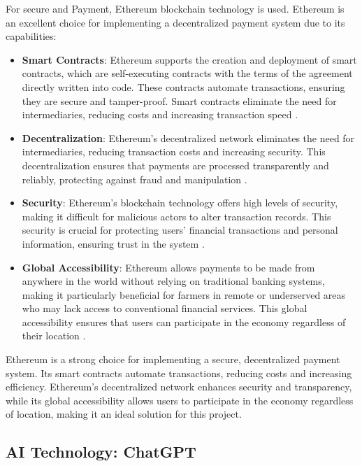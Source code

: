 For secure and Payment, Ethereum blockchain technology is used. Ethereum is an excellent choice for implementing a decentralized payment system due to its capabilities:

\begin{itemize}
    \item \textbf{Smart Contracts}: Ethereum supports the creation and deployment of smart contracts, which are self-executing contracts with the terms of the agreement directly written into code. These contracts automate transactions, ensuring they are secure and tamper-proof. Smart contracts eliminate the need for intermediaries, reducing costs and increasing transaction speed \cite{ethereum_smart_contracts}.
    \item \textbf{Decentralization}: Ethereum's decentralized network eliminates the need for intermediaries, reducing transaction costs and increasing security. This decentralization ensures that payments are processed transparently and reliably, protecting against fraud and manipulation \cite{ethereum_decentralization}.
    \item \textbf{Security}: Ethereum's blockchain technology offers high levels of security, making it difficult for malicious actors to alter transaction records. This security is crucial for protecting users' financial transactions and personal information, ensuring trust in the system \cite{ethereum_security}.
    \item \textbf{Global Accessibility}: Ethereum allows payments to be made from anywhere in the world without relying on traditional banking systems, making it particularly beneficial for farmers in remote or underserved areas who may lack access to conventional financial services. This global accessibility ensures that users can participate in the economy regardless of their location \cite{ethereum_accessibility}.
\end{itemize}
Ethereum is a strong choice for implementing a secure, decentralized payment system. Its smart contracts automate transactions, reducing costs and increasing efficiency. Ethereum's decentralized network enhances security and transparency, while its global accessibility allows users to participate in the economy regardless of location, making it an ideal solution for this project.

\subsection{AI Technology: ChatGPT}

